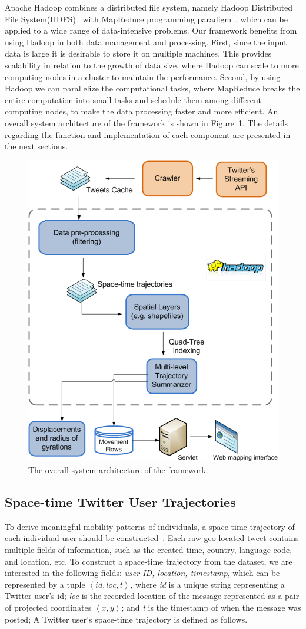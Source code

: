 \documentclass[ijgi,article,accept,moreauthors,pdftex,10pt,a4paper]{mdpi}
\theoremstyle{mdpi}
\newcounter{ex}
\newcounter{re}
\theoremstyle{mdpidefinition}
\begin{document}
Apache Hadoop combines a distributed file system, namely Hadoop Distributed File System(HDFS)~\cite{shvachko2010hadoop} with MapReduce programming paradigm~\cite{dean2008mapreduce}, which can be applied to a wide range of data-intensive problems.
Our framework benefits from using Hadoop in both data management and processing.
First, since the input data is large it is desirable to store it on multiple machines.
This provides scalability in relation to the growth of data size, where Hadoop can scale to more computing nodes in a cluster to maintain the performance.
Second, by using Hadoop we can parallelize the computational tasks, where MapReduce breaks the entire computation into small tasks and schedule them among different computing nodes, to make the data processing faster and more efficient.
An overall system architecture of the framework is shown in Figure~\ref{fig:overall_archi}.
The details regarding the function and implementation of each component are presented in the next sections.

\begin{figure}[ht]
\centering
\includegraphics[width=0.55\linewidth]{./figures/Overall_Architecture222}
\caption{The overall system architecture of the framework.}
\label{fig:overall_archi}
\end{figure}
\FloatBarrier

\subsection{Space-time Twitter User Trajectories}
To derive meaningful mobility patterns of individuals, a space-time trajectory of each individual user should be constructed~\cite{hagerstrand1985time}.
Each raw geo-located tweet contains multiple fields of information, such as the created time, country, language code, and location, etc.
To construct a space-time trajectory from the dataset, we are interested in the following fields: \textit{user ID, location, timestamp}, which can be represented by a tuple $\left\langle id, loc, t\right\rangle$, where \textit{id} is a unique string representing a Twitter user's id; \textit{loc} is the recorded location of the message represented as a pair of projected coordinates $\left\langle x, y\right\rangle$;
and \textit{t} is the timestamp of when the message was posted; A Twitter user's space-time trajectory is defined as follows.
\newline
\end{document}
